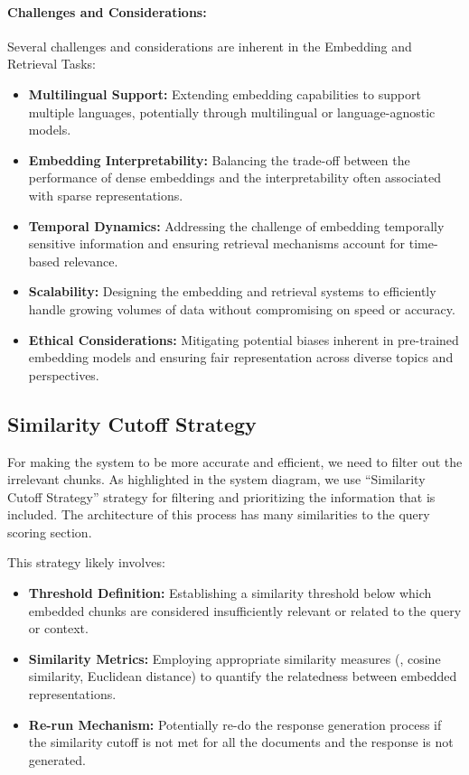 \paragraph{Challenges and Considerations:}
Several challenges and considerations are inherent in the Embedding and Retrieval Tasks:
\begin{itemize}
    \item \textbf{Multilingual Support:} Extending embedding capabilities to support multiple languages, potentially through multilingual or language-agnostic models.
    \item \textbf{Embedding Interpretability:} Balancing the trade-off between the performance of dense embeddings and the interpretability often associated with sparse representations.
    \item \textbf{Temporal Dynamics:} Addressing the challenge of embedding temporally sensitive information and ensuring retrieval mechanisms account for time-based relevance.
    \item \textbf{Scalability:} Designing the embedding and retrieval systems to efficiently handle growing volumes of data without compromising on speed or accuracy.
    \item \textbf{Ethical Considerations:} Mitigating potential biases inherent in pre-trained embedding models and ensuring fair representation across diverse topics and perspectives.
\end{itemize}

\subsection{Similarity Cutoff Strategy}\label{subsec:similarity-cutoff-strategy}
For making the system to be more accurate and efficient, we need to filter out the irrelevant chunks.
As highlighted in the system diagram, we use ``Similarity Cutoff Strategy'' strategy for filtering and prioritizing the information that is included.
The architecture of this process has many similarities to the query scoring section.

This strategy likely involves:
\begin{itemize}
    \item \textbf{Threshold Definition:} Establishing a similarity threshold below which embedded chunks are considered insufficiently relevant or related to the query or context.
    \item \textbf{Similarity Metrics:} Employing appropriate similarity measures (\eg, cosine similarity, Euclidean distance) to quantify the relatedness between embedded representations.
    \item \textbf{Re-run Mechanism:} Potentially re-do the response generation process if the similarity cutoff is not met for all the documents and the response is not generated.
\end{itemize}


